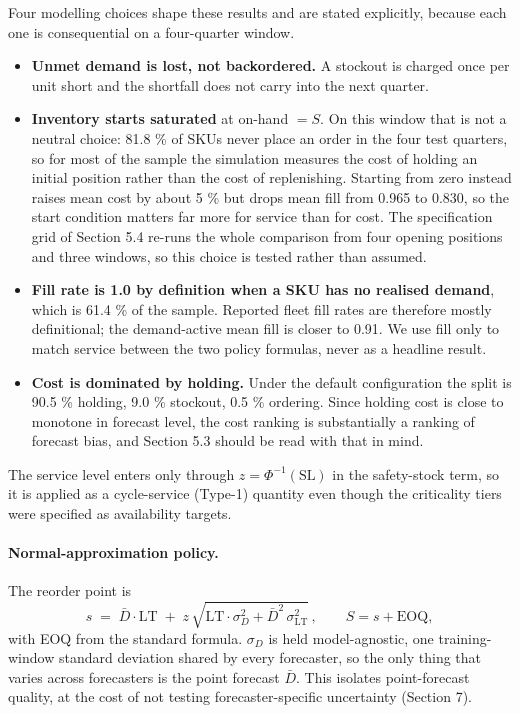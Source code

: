 \documentclass[11pt]{article}
\begin{document}
Four modelling choices shape these results and are stated explicitly, because
each one is consequential on a four-quarter window.

\begin{itemize}
\item \textbf{Unmet demand is lost, not backordered.} A stockout is charged
  once per unit short and the shortfall does not carry into the next quarter.
\item \textbf{Inventory starts saturated} at on-hand $=S$. On this window that
  is not a neutral choice: 81.8 \% of SKUs never place an order in the four
  test quarters, so for most of the sample the simulation measures the cost of
  holding an initial position rather than the cost of replenishing. Starting
  from zero instead raises mean cost by about 5 \% but drops mean fill from
  0.965 to 0.830, so the start condition matters far more for service than for
  cost. The specification grid of Section 5.4 re-runs the whole comparison from
  four opening positions and three windows, so this choice is tested rather
  than assumed.
\item \textbf{Fill rate is 1.0 by definition when a SKU has no realised
  demand}, which is 61.4 \% of the sample. Reported fleet fill rates are
  therefore mostly definitional; the demand-active mean fill is closer to 0.91.
  We use fill only to match service between the two policy formulas, never as a
  headline result.
\item \textbf{Cost is dominated by holding.} Under the default configuration
  the split is 90.5 \% holding, 9.0 \% stockout, 0.5 \% ordering. Since holding
  cost is close to monotone in forecast level, the cost ranking is
  substantially a ranking of forecast bias, and Section 5.3 should be read with
  that in mind.
\end{itemize}

The service level enters only through $z = \Phi^{-1}(\mathrm{SL})$ in the
safety-stock term, so it is applied as a cycle-service (Type-1) quantity even
though the criticality tiers were specified as availability targets.

\paragraph{Normal-approximation policy.} The reorder point is
\begin{equation*}
s \;=\; \bar{D}\cdot \mathrm{LT}
\;+\; z\,\sqrt{\mathrm{LT}\cdot \sigma_{D}^{2} + \bar{D}^{2}\,\sigma_{\mathrm{LT}}^{2}}\,,
\qquad S = s + \mathrm{EOQ},
\end{equation*}
with EOQ from the standard formula. $\sigma_{D}$ is held model-agnostic, one
training-window standard deviation shared by every forecaster, so the only
thing that varies across forecasters is the point forecast $\bar{D}$. This
isolates point-forecast quality, at the cost of not testing
forecaster-specific uncertainty (Section 7).
\end{document}
